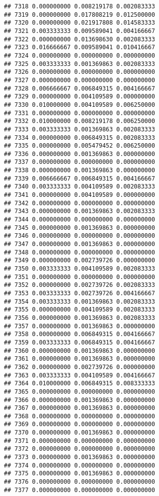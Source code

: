 \documentclass[
]{article}
\begin{document}
\begin{verbatim}
## 7318 0.000000000 0.008219178 0.002083333
## 7319 0.000000000 0.017808219 0.012500000
## 7320 0.000000000 0.021917808 0.014583333
## 7321 0.003333333 0.009589041 0.004166667
## 7322 0.000000000 0.013698630 0.002083333
## 7323 0.016666667 0.009589041 0.010416667
## 7324 0.000000000 0.000000000 0.000000000
## 7325 0.003333333 0.001369863 0.002083333
## 7326 0.000000000 0.000000000 0.000000000
## 7327 0.000000000 0.000000000 0.000000000
## 7328 0.006666667 0.006849315 0.004166667
## 7329 0.000000000 0.004109589 0.000000000
## 7330 0.010000000 0.004109589 0.006250000
## 7331 0.000000000 0.000000000 0.000000000
## 7332 0.010000000 0.008219178 0.006250000
## 7333 0.003333333 0.001369863 0.002083333
## 7334 0.000000000 0.006849315 0.002083333
## 7335 0.000000000 0.005479452 0.006250000
## 7336 0.000000000 0.001369863 0.000000000
## 7337 0.000000000 0.000000000 0.000000000
## 7338 0.000000000 0.001369863 0.000000000
## 7339 0.006666667 0.006849315 0.004166667
## 7340 0.003333333 0.004109589 0.002083333
## 7341 0.000000000 0.004109589 0.000000000
## 7342 0.000000000 0.000000000 0.000000000
## 7343 0.000000000 0.001369863 0.002083333
## 7344 0.000000000 0.000000000 0.000000000
## 7345 0.000000000 0.001369863 0.000000000
## 7346 0.000000000 0.000000000 0.000000000
## 7347 0.000000000 0.001369863 0.000000000
## 7348 0.000000000 0.000000000 0.000000000
## 7349 0.000000000 0.002739726 0.000000000
## 7350 0.003333333 0.004109589 0.002083333
## 7351 0.000000000 0.000000000 0.000000000
## 7352 0.000000000 0.002739726 0.002083333
## 7353 0.003333333 0.002739726 0.004166667
## 7354 0.003333333 0.001369863 0.002083333
## 7355 0.000000000 0.004109589 0.002083333
## 7356 0.000000000 0.001369863 0.002083333
## 7357 0.000000000 0.001369863 0.000000000
## 7358 0.000000000 0.006849315 0.004166667
## 7359 0.003333333 0.006849315 0.004166667
## 7360 0.000000000 0.001369863 0.000000000
## 7361 0.000000000 0.001369863 0.000000000
## 7362 0.000000000 0.002739726 0.000000000
## 7363 0.003333333 0.004109589 0.004166667
## 7364 0.010000000 0.006849315 0.008333333
## 7365 0.000000000 0.000000000 0.000000000
## 7366 0.000000000 0.001369863 0.000000000
## 7367 0.000000000 0.001369863 0.000000000
## 7368 0.000000000 0.000000000 0.000000000
## 7369 0.000000000 0.000000000 0.000000000
## 7370 0.000000000 0.001369863 0.000000000
## 7371 0.000000000 0.000000000 0.000000000
## 7372 0.000000000 0.000000000 0.000000000
## 7373 0.000000000 0.001369863 0.000000000
## 7374 0.000000000 0.000000000 0.000000000
## 7375 0.000000000 0.001369863 0.000000000
## 7376 0.000000000 0.000000000 0.000000000
## 7377 0.000000000 0.000000000 0.000000000

\end{verbatim}
\end{document}
